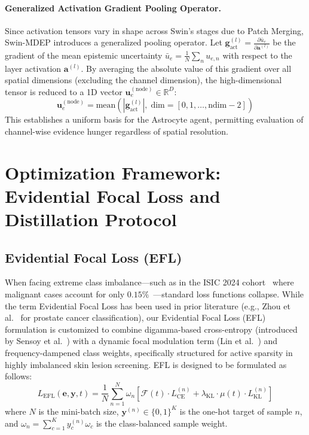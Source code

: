 \documentclass[11pt, a4paper]{article}
\newcommand{\R}{\mathbb{R}}
\begin{document}
\paragraph{Generalized Activation Gradient Pooling Operator.}
Since activation tensors vary in shape across Swin's stages due to Patch Merging, Swin-MDEP introduces a generalized pooling operator. Let $\bm{g}_{\text{act}}^{(l)} = \frac{\partial \bar{u}_e}{\partial \bm{a}^{(l)}}$ be the gradient of the mean epistemic uncertainty $\bar{u}_e = \frac{1}{N}\sum_n u_{e,n}$ with respect to the layer activation $\bm{a}^{(l)}$. By averaging the absolute value of this gradient over all spatial dimensions (excluding the channel dimension), the high-dimensional tensor is reduced to a 1D vector $\bm{u}_e^{(\text{node})} \in \R^D$:
\begin{equation}\label{eq:activation_pooling}
    \bm{u}_e^{(\text{node})} = \text{mean}\!\left(|\bm{g}_{\text{act}}^{(l)}|,\; \text{dim}=[0, 1, \ldots, \text{ndim}-2]\right)
\end{equation}
This establishes a uniform basis for the Astrocyte agent, permitting evaluation of channel-wise evidence hunger regardless of spatial resolution.

\section{Optimization Framework: Evidential Focal Loss and Distillation Protocol}\label{sec:optimization}

\subsection{Evidential Focal Loss (EFL)}\label{subsec:efl}

When facing extreme class imbalance---such as in the ISIC 2024 cohort~\cite{isic2024} where malignant cases account for only $0.15\%$~\cite{johnson2019survey}---standard loss functions collapse. While the term Evidential Focal Loss has been used in prior literature (e.g., Zhou et al.~\cite{zhou2023domain} for prostate cancer classification), our Evidential Focal Loss (EFL) formulation is customized to combine digamma-based cross-entropy (introduced by Sensoy et al.~\cite{sensoy2018evidential}) with a dynamic focal modulation term (Lin et al.~\cite{lin2017focal}) and frequency-dampened class weights, specifically structured for active sparsity in highly imbalanced skin lesion screening. EFL is designed to be formulated as follows:
\begin{equation}\label{eq:efl}
    L_{\text{EFL}}(\bm{e}, \bm{y}, t) = \frac{1}{N} \sum_{n=1}^N \omega_n \left[\mathcal{F}(t) \cdot L_{\text{CE}}^{(n)} + \lambda_{\text{KL}} \cdot \mu(t) \cdot L_{\text{KL}}^{(n)}\right]
\end{equation}
where $N$ is the mini-batch size, $\bm{y}^{(n)} \in \{0, 1\}^K$ is the one-hot target of sample $n$, and $\omega_n = \sum_{c=1}^K y_c^{(n)} \omega_c$ is the class-balanced sample weight.
\end{document}
